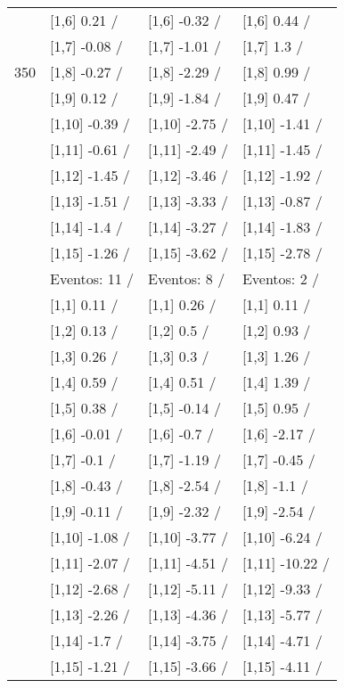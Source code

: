 \begin{table}
\begin{tabular}[t]{llll}
 & {}[1,6] 0.21  / & {}[1,6] -0.32  / & {}[1,6] 0.44  /\\
 & {}[1,7] -0.08  / & {}[1,7] -1.01  / & {}[1,7] 1.3  /\\
350 & {}[1,8] -0.27  / & {}[1,8] -2.29  / & {}[1,8] 0.99  /\\
\addlinespace
 & {}[1,9] 0.12  / & {}[1,9] -1.84  / & {}[1,9] 0.47  /\\
 & {}[1,10] -0.39  / & {}[1,10] -2.75  / & {}[1,10] -1.41  /\\
 & {}[1,11] -0.61  / & {}[1,11] -2.49  / & {}[1,11] -1.45  /\\
 & {}[1,12] -1.45  / & {}[1,12] -3.46  / & {}[1,12] -1.92  /\\
 & {}[1,13] -1.51  / & {}[1,13] -3.33  / & {}[1,13] -0.87  /\\
\addlinespace
 & {}[1,14] -1.4  / & {}[1,14] -3.27  / & {}[1,14] -1.83  /\\
 & {}[1,15] -1.26  / & {}[1,15] -3.62  / & {}[1,15] -2.78  /\\
 & Eventos:  11 / & Eventos:  8 / & Eventos:  2 /\\
 & {}[1,1] 0.11  / & {}[1,1] 0.26  / & {}[1,1] 0.11  /\\
 & {}[1,2] 0.13  / & {}[1,2] 0.5  / & {}[1,2] 0.93  /\\
\addlinespace
 & {}[1,3] 0.26  / & {}[1,3] 0.3  / & {}[1,3] 1.26  /\\
 & {}[1,4] 0.59  / & {}[1,4] 0.51  / & {}[1,4] 1.39  /\\
 & {}[1,5] 0.38  / & {}[1,5] -0.14  / & {}[1,5] 0.95  /\\
 & {}[1,6] -0.01  / & {}[1,6] -0.7  / & {}[1,6] -2.17  /\\
 & {}[1,7] -0.1  / & {}[1,7] -1.19  / & {}[1,7] -0.45  /\\
\addlinespace
500 & {}[1,8] -0.43  / & {}[1,8] -2.54  / & {}[1,8] -1.1  /\\
 & {}[1,9] -0.11  / & {}[1,9] -2.32  / & {}[1,9] -2.54  /\\
 & {}[1,10] -1.08  / & {}[1,10] -3.77  / & {}[1,10] -6.24  /\\
 & {}[1,11] -2.07  / & {}[1,11] -4.51  / & {}[1,11] -10.22  /\\
 & {}[1,12] -2.68  / & {}[1,12] -5.11  / & {}[1,12] -9.33  /\\
\addlinespace
 & {}[1,13] -2.26  / & {}[1,13] -4.36  / & {}[1,13] -5.77  /\\
 & {}[1,14] -1.7  / & {}[1,14] -3.75  / & {}[1,14] -4.71  /\\
 & {}[1,15] -1.21  / & {}[1,15] -3.66  / & {}[1,15] -4.11  /\\
\bottomrule
\end{tabular}
\end{table}
